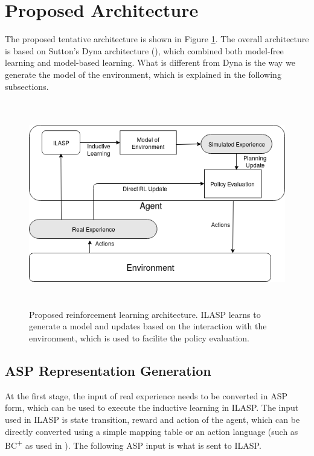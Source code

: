 \documentclass[12pt,twoside]{report}
\begin{document}
\section{Proposed Architecture}
\label{proposed_architecture_section}

The proposed tentative architecture is shown in Figure \ref{proposed_architecture}. The overall architecture is based on Sutton's Dyna architecture (\cite{Sutton1990}), which combined both model-free learning and model-based learning. What is different from Dyna is the way we generate the model of the environment, which is explained in the following subsections.

\begin{figure}[!htb]
\centering
\includegraphics[width=15cm, height=9cm]{./figures/ILASRL}
\caption{Proposed reinforcement learning architecture. ILASP learns to generate a model and updates based on the interaction with the environment, which is used to facilite the policy evaluation. }
\label{proposed_architecture}
\end{figure}

\subsection{ASP Representation Generation}
\label{asp_representation_generation_subsection}

At the first stage,  the input of real experience needs to be converted in ASP form, which can be used to execute the inductive learning in ILASP. The input used in ILASP is state transition, reward and action of the agent, which can be directly converted using a simple mapping table or an action language (such as BC\textsuperscript{+} as used in \cite{Ferreira2017}). The following ASP input is what is sent to ILASP. \\
\end{document}

